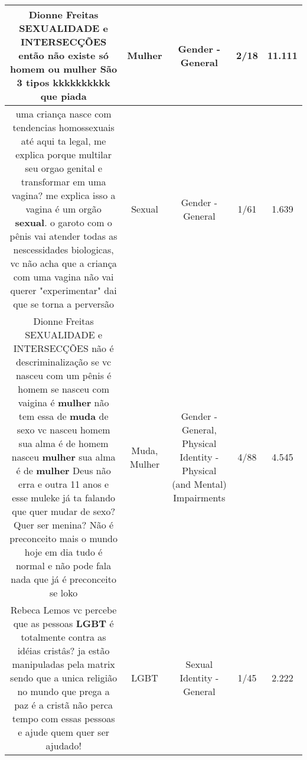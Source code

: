 \documentclass[11pt]{article}
\newlength\mylength
\begin{document}
\begin{center}
\begin{longtable}{|C{.65\mylength}|C{.30\mylength}|C{.12\mylength}|C{.12\mylength}|C{.12\mylength}|}
  \small Dionne Freitas SEXUALIDADE e INTERSECÇÕES então não existe só homem ou \textbf{mulher} São 3 tipos kkkkkkkkkk que piada\normalsize   & Mulher & Gender - General & 2/18 & 11.111 \\  \hline
  \small uma criança nasce com tendencias homossexuais até aqui ta legal, me explica porque multilar seu orgao genital e transformar em uma vagina? me explica isso a vagina é um orgão \textbf{sexual}. o garoto com o pênis vai atender todas as nescessidades biologicas, vc não acha que a criança com uma vagina não vai querer "experimentar" dai que se torna a perversão\normalsize   & Sexual & Gender - General & 1/61 & 1.639 \\  \hline
  \small Dionne Freitas SEXUALIDADE e INTERSECÇÕES não é descriminalização se vc nasceu com um pênis é homem se nasceu com vaigina é \textbf{mulher} não tem essa de \textbf{muda} de sexo vc nasceu homem sua alma é de homem nasceu \textbf{mulher} sua alma é de \textbf{mulher} Deus não erra e outra 11 anos e esse muleke já ta falando que quer mudar de sexo? Quer ser menina? Não é preconceito mais o mundo hoje em dia tudo é normal e não pode fala nada que já é preconceito se loko\normalsize   & Muda, Mulher & Gender - General, Physical Identity - Physical (and Mental) Impairments & 4/88 & 4.545 \\  \hline
  \small Rebeca Lemos vc percebe que as pessoas \textbf{LGBT} é totalmente contra as idéias cristâs? ja estão manipuladas pela matrix sendo que a unica religião no mundo que prega a paz é a cristã não perca tempo com essas pessoas e ajude quem quer ser ajudado!\normalsize   & LGBT & Sexual Identity - General & 1/45 & 2.222 \\  \hline

\end{longtable}
\end{center}
\end{document}
